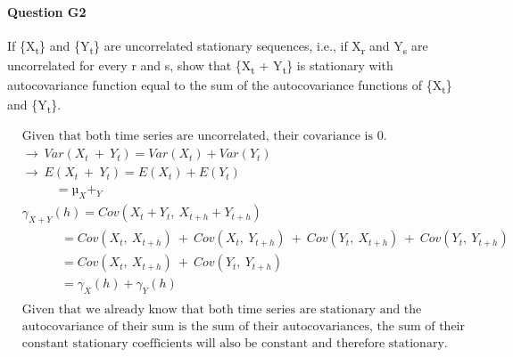 \documentclass[
]{article}
\begin{document}
\hypertarget{question-g2}{%
\paragraph{Question G2}\label{question-g2}}

If \{X\textsubscript{t}\} and \{Y\textsubscript{t}\} are uncorrelated
stationary sequences, i.e., if X\textsubscript{r} and Y\textsubscript{s}
are uncorrelated for every r and s, show that \{X\textsubscript{t} +
Y\textsubscript{t}\} is stationary with autocovariance function equal to
the sum of the autocovariance functions of \{X\textsubscript{t}\} and
\{Y\textsubscript{t}\}.

\[
\begin{aligned}
& \text{Given that both time series are uncorrelated, their covariance is 0}. \\
& \rightarrow\ Var(X_{t}\ +\ Y_{t}) = Var(X_{t}) + Var(Y_{t}) \\
& \rightarrow\ E(X_{t}\ +\ Y_{t}) = E(X_{t}) + E(Y_{t})\\
& \ \ \ \ \ \ \ \ \ \ \ \ = µ_{X}+_{Y}\\
&\gamma_{X+Y}(h) = Cov(X_{t}+Y_{t},\ X_{t+h}+Y_{t+h})\\
& \ \ \ \ \ \ \ \ \ \ \ \ \ \ = Cov(X_{t},\ X_{t+h})\ +\ Cov(X_{t},\ Y_{t+h})\ +\ Cov(Y_{t},\ X_{t+h})\ +\ Cov(Y_{t},\ Y_{t+h})\\
&\ \ \ \ \ \ \ \ \ \ \ \ \ \ = Cov(X_{t},\ X_{t+h})\ +\ Cov(Y_{t},\ Y_{t+h}) \\
&\ \ \ \ \ \ \ \ \ \ \ \ \ \  = \gamma_{X}(h) + \gamma_{Y}(h)\\ \\
&\text{Given that we already know that both time series are stationary and the}\\
&\text{autocovariance of their sum is the sum of their autocovariances, the sum of their}\\
&\text{constant stationary coefficients will also be constant and therefore stationary.}
\end{aligned}
\]
\end{document}
